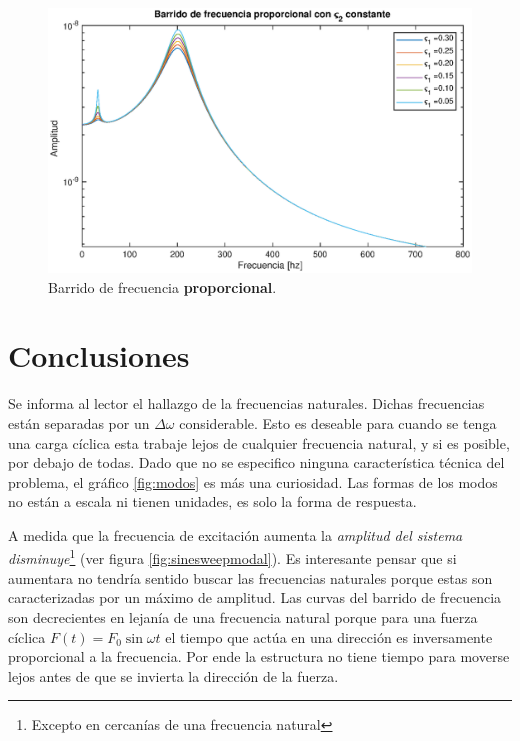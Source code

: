 \documentclass[onecolumn,10pt,titlepage,a4paper]{article}
\begin{document}
\begin{figure}[htb!]
	\centering
	\includegraphics[width=1\textwidth]{fig/sinesweepprop2const.eps}
	\caption{Barrido de frecuencia \textbf{proporcional}.}
	\label{fig:sinesweepprop2}
\end{figure}





\clearpage
\section{Conclusiones}
Se informa al lector el hallazgo de la frecuencias naturales. Dichas frecuencias están separadas por un $\Delta \omega $ considerable. Esto es deseable para cuando se tenga una carga cíclica esta trabaje lejos de cualquier frecuencia natural, y si es posible, por debajo de todas. Dado que no se especifico ninguna característica técnica del problema, el gráfico \ref{fig:modos} es más una curiosidad. Las formas de los modos no están a escala ni tienen unidades, es solo la forma de respuesta. 

A medida que la frecuencia de excitación aumenta la \textit{amplitud del sistema disminuye}\footnote{Excepto en cercanías de una frecuencia natural} (ver figura \ref{fig:sinesweepmodal}). Es interesante pensar que si aumentara no tendría sentido buscar las frecuencias naturales porque estas son caracterizadas por un máximo de amplitud. Las curvas del barrido de frecuencia son decrecientes en lejanía de una frecuencia natural porque para una fuerza cíclica $F(t)=F_0\sin \omega t$ el tiempo que actúa en una dirección es inversamente proporcional a la frecuencia. Por ende la estructura no tiene tiempo para moverse lejos antes de que se invierta la dirección de la fuerza.
\end{document}
